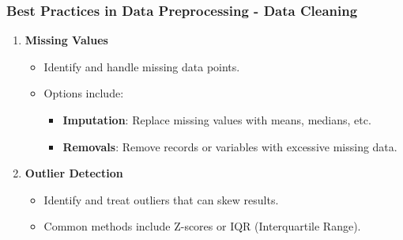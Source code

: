 \documentclass[aspectratio=169]{beamer}
\begin{document}
\begin{frame}[fragile]
    \frametitle{Best Practices in Data Preprocessing - Data Cleaning}
    \begin{enumerate}
        \item \textbf{Missing Values}
            \begin{itemize}
                \item Identify and handle missing data points.
                \item Options include:
                    \begin{itemize}
                        \item \textbf{Imputation}: Replace missing values with means, medians, etc.
                        \item \textbf{Removals}: Remove records or variables with excessive missing data.
                    \end{itemize}
            \end{itemize}
        \item \textbf{Outlier Detection}
            \begin{itemize}
                \item Identify and treat outliers that can skew results.
                \item Common methods include Z-scores or IQR (Interquartile Range).
            \end{itemize}
    \end{enumerate}
\end{frame}
\end{document}
